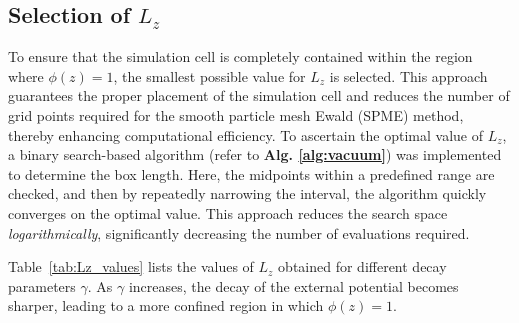 \subsection{Selection of  $L_z$}
To ensure that the simulation cell is completely contained within the region where $\phi(z) = 1$, the smallest possible value for $L_z$ is selected. This approach guarantees the proper placement of the simulation cell and reduces the number of grid points required for the smooth particle mesh Ewald (SPME) method, thereby enhancing computational efficiency. To ascertain the optimal value of $L_z$, a binary search-based algorithm (refer to \textbf{Alg. \ref{alg:vacuum}}) was implemented to determine the box length. Here, the midpoints within a predefined range are checked, and then by repeatedly narrowing the interval, the algorithm quickly converges on the optimal value. This approach reduces the search space \textit{logarithmically}, significantly decreasing the number of evaluations required.

Table~\ref{tab:Lz_values} lists the values of $L_z$ obtained for different decay parameters $\gamma$. As $\gamma$ increases, the decay of the external potential becomes sharper, leading to a more confined region in which $\phi(z) = 1$. 



